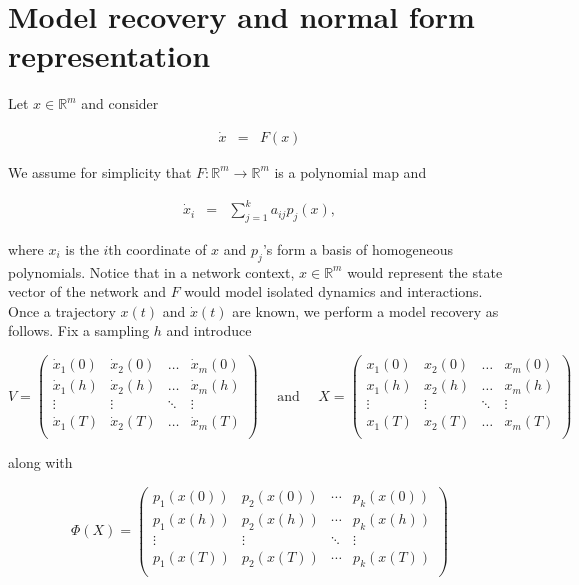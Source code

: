 \documentclass[12pt]{article}
\theoremstyle{plain}
\theoremstyle{definition}
\theoremstyle{remark}
\theoremstyle{remark}
\begin{document}
\section{Model recovery and normal form representation}\label{Data}
Let $x\in \mathbb{R}^m$ and consider 

\begin{eqnarray}\label{Rx}
\dot x &=& F(x)  
\end{eqnarray}

We assume for simplicity that $F: \mathbb{R}^m \rightarrow \mathbb{R}^m$ is a polynomial map and  

\begin{eqnarray}\label{Rx}
\dot x_i&=& \sum_{j=1}^k a_{i j} p_j(x),
\end{eqnarray}

\noindent
where $x_i$ is the $i$th coordinate of $x$ and $p_j$'s form a basis of homogeneous polynomials. 
Notice that in a network context, $x\in \mathbb{R}^m$ would represent the state vector of the network and $F$ would model isolated dynamics and interactions. Once a trajectory $x(t)$ and $\dot x(t)$ are known, we perform a model recovery as follows. Fix a sampling $h$ and introduce 

$$
 V = \left(
\begin{array}{cccc}
\dot x_1(0) & \dot x_2(0) & \dots & \dot x_m(0)\\
\dot x_1(h) & \dot x_2(h) & \dots & \dot x_m(h)\\
\vdots & \vdots& \ddots & \vdots \\
\dot x_1(T) & \dot x_2(T) & \dots & \dot x_m(T)\\
\end{array}
\right) \mbox{~ ~ and ~ ~} 
X = \left(
\begin{array}{cccc}
 x_1 (0) & x_2 (0)& \dots & x_m (0)\\
 x_1 (h) & x_2 (h)& \dots & x_m (h)\\
\vdots & \vdots& \ddots & \vdots \\
x_1 (T) & x_2 (T)& \dots & x_m (T)\\
\end{array}
\right)
$$

along with 

\[
\Phi(X) =
\left(
\begin{array}{cccc}
p_1(x(0)) 	   & p_2(x(0)) & \cdots & p_k(x(0)) \\
p_1(x(h)) 	   & p_2(x(h)) & \cdots & p_k(x(h)) \\
\vdots & \vdots & \ddots & \vdots \\ 
p_1(x(T)) 	   & p_2(x(T)) & \cdots & p_k(x(T)) \\
\end{array}
\right) \nonumber
\]
\end{document}
